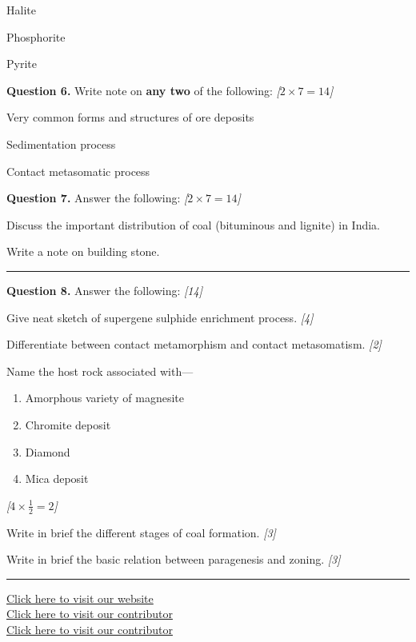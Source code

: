 \documentclass[11pt,a4paper]{article}
\newcommand{\pts}[1]{\hfill   \textit{[#1]}}
\begin{document}
\begin{parts}
  \item Halite
  \item Phosphorite
  \item Pyrite
\end{parts}

\medskip


\noindent   \textbf{Question 6.} Write note on   \textbf{any two} of the following: \pts{$2  \times 7 = 14$}

\begin{parts}
  \item Very common forms and structures of ore deposits
  \item Sedimentation process
  \item Contact metasomatic process
\end{parts}

\medskip


\noindent   \textbf{Question 7.} Answer the following: \pts{$2  \times 7 = 14$}

\begin{parts}
  \item Discuss the important distribution of coal (bituminous and lignite) in India.
  \item Write a note on building stone.
\end{parts}

\bigskip


\rule{\linewidth}{0.4pt}\smallskip




\noindent   \textbf{Question 8.} Answer the following: \pts{14}

\begin{parts}
  \item Give neat sketch of supergene sulphide enrichment process. \pts{4}
  \item Differentiate between contact metamorphism and contact metasomatism. \pts{2}
  \item Name the host rock associated with---
  
\begin{enumerate}[label=(\roman*),leftmargin=*,itemsep=2pt]
    \item Amorphous variety of magnesite
    \item Chromite deposit
    \item Diamond
    \item Mica deposit
  \end{enumerate} \pts{$4  \times \frac{1}{2} = 2$}
  \item Write in brief the different stages of coal formation. \pts{3}
  \item Write in brief the basic relation between paragenesis and zoning. \pts{3}
\end{parts}

\vfill\rule{\linewidth}{0.4pt}

\begin{center}\small
\href{https://bhu-exam.vercel.app/}{Click here to visit our website}\\[4pt]
\href{https://me-aryan.vercel.app/}{Click here to visit our contributor}\\[4pt]
\href{https://quashan-me.vercel.app/}{Click here to visit our contributor}
\end{center}
\end{document}
